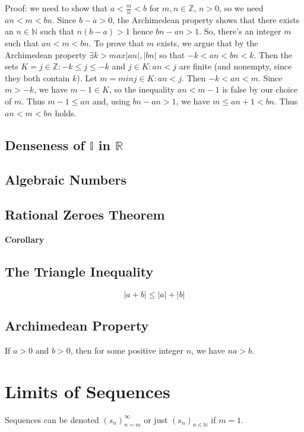 \documentclass[12pt]{article}
\newcommand{\N}{\mathbb{N}}
\newcommand{\Z}{\mathbb{Z}}
\newcommand{\I}{\mathbb{I}}
\newcommand{\R}{\mathbb{R}}
\begin{document}
Proof: we need to show that $a < \frac{m}{n} < b$ for $m, n \in \Z$, $n > 0$, so we need $an < m < bn$. Since $b - a > 0$, the Archimedean property shows that there exists an $n \in \N$ such that $n(b-a) > 1$ hence $bn - an > 1$. So, there's an integer $m$ such that $an < m < bn$. To prove that $m$ exists, we argue that by the Archimedean property $\exists k > max{|an|, |bn|}$ so that $-k < an < bn <k$. Then the sets $K = {j \in \Z : -k \leq j \leq -k}$ and ${j \in K : an < j}$ are finite (and nonempty, since they both contain $k$). Let $m = min{j \in K : an < j}$. Then $-k < an < m$. Since $ m > -k$, we have $m-1 \in K$, so the inequality $an < m - 1$ is false by our choice of $m$. Thus $m - 1 \leq an$ and, using $bn - an > 1$, we have $m \leq an + 1 < bn$. Thus $an < m < bn$ holds.

\subsection{Denseness of $\I$ in $\R$}

\subsection{Algebraic Numbers}

\subsection{Rational Zeroes Theorem}

\textbf{Corollary}

\subsection{The Triangle Inequality}

$$|a + b| \leq |a| + |b|$$

\subsection{Archimedean Property}

If $a > 0$ and $b > 0$, then for some positive integer $n$, we have $na > b$.

\section{Limits of Sequences}

Sequences can be denoted $(s_{n})_{n=m}^{\infty}$ or just $(s_{n})_{n\in \mathbb{N}}$ if $m=1$.
\end{document}
